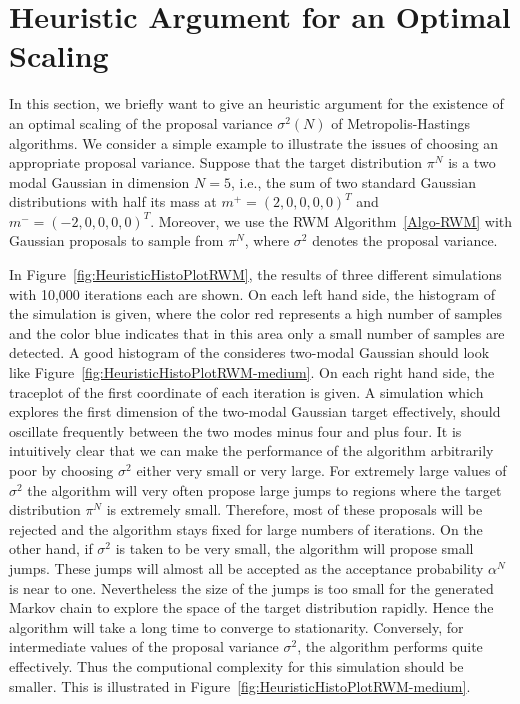 \section{Heuristic Argument for an Optimal Scaling}
\label{CC:Heuristics}

In this section, we briefly want to give an heuristic argument for the existence of an optimal scaling of the proposal variance $ \sigma^2 (N) $ of Metropolis-Hastings algorithms.
We consider a simple example to illustrate the issues of choosing an appropriate proposal variance. Suppose that the target distribution $ \pi^{N} $ is a two modal Gaussian in dimension $N=5$, i.e., the sum of two standard Gaussian distributions with half its mass at $ m^+ = (2,0,0,0,0)^T $ and  $ m^- = (-2,0,0,0,0)^T $. Moreover, we use the RWM Algorithm~\ref{Algo-RWM} with Gaussian proposals to sample from $ \pi^{N} $, where $ \sigma^2 $ denotes the proposal variance.

In Figure~\ref{fig:HeuristicHistoPlotRWM}, the results of three different simulations with 10,000 iterations each are shown. On each left hand side, the histogram of the simulation is given, where the color red represents a high number of samples and the color blue indicates that in this area only a small number of samples are detected. A good histogram of the consideres two-modal Gaussian should look like Figure~\ref{fig:HeuristicHistoPlotRWM-medium}. On each right hand side, the traceplot of the first coordinate of each iteration is given. A simulation which explores the first dimension of the two-modal Gaussian target effectively, should oscillate frequently between the two modes minus four and plus four. It is intuitively clear that we can make the performance of the algorithm arbitrarily poor by choosing $ \sigma^2 $ either very small or very large. For extremely large values of $ \sigma^2 $ the algorithm will very often propose large jumps to regions where the target distribution $ \pi^{N} $ is extremely small. Therefore, most of these proposals will be rejected and the algorithm stays fixed for large numbers of iterations. On the other hand, if $\sigma^2$ is taken to be very small, the algorithm will propose small jumps. These jumps will almost all be accepted as the acceptance probability $ \alpha^{N} $ is near to one. Nevertheless the size of the jumps is too small for the generated Markov chain to explore the space of the target distribution rapidly. Hence the algorithm will take a long time to converge to stationarity. Conversely, for intermediate values of the proposal variance $\sigma^2$, the algorithm performs quite effectively. Thus the computional complexity for this simulation should be smaller. This is illustrated in Figure~\ref{fig:HeuristicHistoPlotRWM-medium}.

